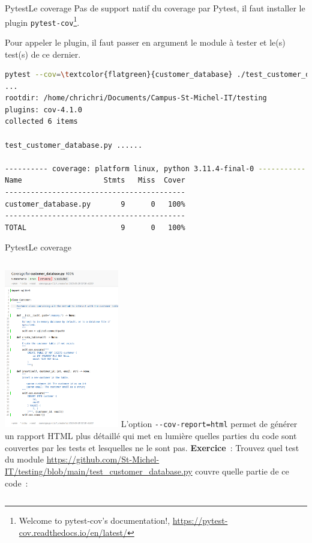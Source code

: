\documentclass{beamer}
\begin{document}
    \begin{frame}[fragile]{Pytest}{Le coverage}
        \transdissolve
        Pas de support natif du coverage par Pytest, il faut installer le plugin \lstinline{pytest-cov}\footnote{Welcome to pytest-cov’s documentation!, \url{https://pytest-cov.readthedocs.io/en/latest/}}.

        Pour appeler le plugin, il faut passer en argument le module à tester et le(s) test(s) de ce dernier.


        \begin{lstlisting}[language=sh]
pytest --cov=\textcolor{flatgreen}{customer_database} ./test_customer_database.py
...
rootdir: /home/chrichri/Documents/Campus-St-Michel-IT/testing
plugins: cov-4.1.0
collected 6 items

test_customer_database.py ......                                                                                                                                                                                                 [100%]

---------- coverage: platform linux, python 3.11.4-final-0 -----------
Name                   Stmts   Miss  Cover
------------------------------------------
customer_database.py       9      0   100%
------------------------------------------
TOTAL                      9      0   100%
        \end{lstlisting}

    \end{frame}

    \begin{frame}{Pytest}{Le coverage}
        \transdissolve
        \begin{columns}

            \centering
            \includegraphics[width=5cm]{image/html-coverage}
            L'option \lstinline{--cov-report=html} permet de générer un rapport HTML plus détaillé qui met en lumière quelles parties du code sont couvertes par les tests et lesquelles ne le sont pas.
            \bigbreak
            \textbf{Exercice}~: Trouvez quel test du module \url{https://github.com/St-Michel-IT/testing/blob/main/test_customer_database.py} couvre quelle partie de ce code~:
        \end{columns}

    \end{frame}
\end{document}
